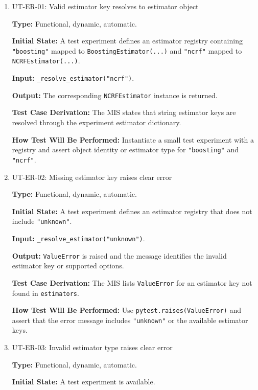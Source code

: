 \documentclass[12pt, titlepage]{article}
\begin{document}
\begin{enumerate}

\item{UT-ER-01: Valid estimator key resolves to estimator object\\}

\textbf{Type:} Functional, dynamic, automatic.

\textbf{Initial State:} A test experiment defines an estimator registry containing \texttt{"boosting"} mapped to \texttt{BoostingEstimator(...)} and \texttt{"ncrf"} mapped to \texttt{NCRFEstimator(...)}.

\textbf{Input:} \texttt{\_resolve\_estimator("ncrf")}.

\textbf{Output:} The corresponding \texttt{NCRFEstimator} instance is returned.

\textbf{Test Case Derivation:} The MIS states that string estimator keys are resolved through the experiment estimator dictionary.

\textbf{How Test Will Be Performed:} Instantiate a small test experiment with a registry and assert object identity or estimator type for \texttt{"boosting"} and \texttt{"ncrf"}.

\item{UT-ER-02: Missing estimator key raises clear error\\}

\textbf{Type:} Functional, dynamic, automatic.

\textbf{Initial State:} A test experiment defines an estimator registry that does not include \texttt{"unknown"}.

\textbf{Input:} \texttt{\_resolve\_estimator("unknown")}.

\textbf{Output:} \texttt{ValueError} is raised and the message identifies the invalid estimator key or supported options.

\textbf{Test Case Derivation:} The MIS lists \texttt{ValueError} for an estimator key not found in \texttt{estimators}.

\textbf{How Test Will Be Performed:} Use \texttt{pytest.raises(ValueError)} and assert that the error message includes \texttt{"unknown"} or the available estimator keys.

\item{UT-ER-03: Invalid estimator type raises clear error\\}

\textbf{Type:} Functional, dynamic, automatic.

\textbf{Initial State:} A test experiment is available.


\end{enumerate}
\end{document}
